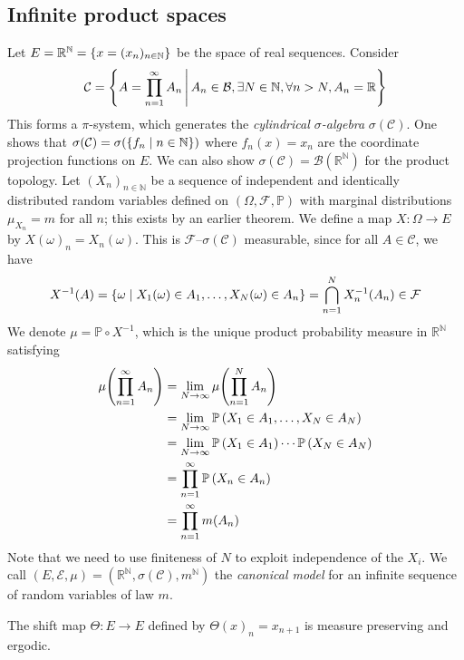 \subsection{Infinite product spaces}
Let \( E = \mathbb R^{\mathbb N} = \qty{x = (x_n)_{n \in \mathbb N}} \) be the space of real sequences.
Consider
\[ \mathcal C = \qty{A = \prod_{n=1}^\infty A_n \,\middle|\,A_n \in \mathcal B, \exists N \in \mathbb N, \forall n > N, A_n = \mathbb R} \]
This forms a \( \pi \)-system, which generates the \emph{cylindrical \( \sigma \)-algebra} \( \sigma(\mathcal C) \).
One shows that \( \sigma(\mathcal C) = \sigma(\qty{f_n \mid n \in \mathbb N}) \) where \( f_n(x) = x_n \) are the coordinate projection functions on \( E \).
We can also show \( \sigma(\mathcal C) = \mathcal B(\mathbb R^{\mathbb N}) \) for the product topology.
Let \( (X_n)_{n \in \mathbb N} \) be a sequence of independent and identically distributed random variables defined on \( (\Omega, \mathcal F, \mathbb P) \) with marginal distributions \( \mu_{X_n} = m \) for all \( n \); this exists by an earlier theorem.
We define a map \( X \colon \Omega \to E \) by \( X(\omega)_n = X_n(\omega) \).
This is \( \mathcal F \)--\( \sigma(\mathcal C) \) measurable, since for all \( A \in \mathcal C \), we have
\[ X^{-1}(A) = \qty{\omega \mid X_1(\omega) \in A_1, \dots, X_N(\omega) \in A_n} = \bigcap_{n=1}^N X_n^{-1}(A_n) \in \mathcal F \]
We denote \( \mu = \mathbb P \circ X^{-1} \), which is the unique product probability measure in \( \mathbb R^{\mathbb N} \) satisfying
\begin{align*}
		\mu\qty(\prod_{n=1}^\infty A_n) &= \lim_{N \to \infty} \mu\qty(\prod_{n=1}^N A_n) \\
		&= \lim_{N \to \infty} \mathbb{P}\left({X_1 \in A_1, \dots, X_N \in A_N}\right) \\
		&= \lim_{N \to \infty} \mathbb{P}\left({X_1 \in A_1}\right) \cdots \mathbb{P}\left({X_N \in A_N}\right) \\
		&= \prod_{n=1}^\infty \mathbb{P}\left({X_n \in A_n}\right) \\
		&= \prod_{n=1}^\infty m(A_n)
\end{align*}
Note that we need to use finiteness of \( N \) to exploit independence of the \( X_i \).
We call \( (E, \mathcal E, \mu) = (\mathbb R^{\mathbb N}, \sigma(\mathcal C), m^{\mathbb N}) \) the \emph{canonical model} for an infinite sequence of random variables of law \( m \).
\begin{theorem}
	The shift map \( \Theta \colon E \to E \) defined by \( \Theta(x)_n = x_{n+1} \) is measure preserving and ergodic.
\end{theorem}
